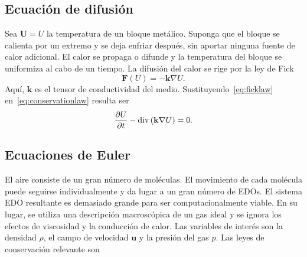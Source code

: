 \subsection*{Ecuación de difusión}

Sea $\mathbf{U}=U$ la temperatura de un bloque metálico.
Suponga que el bloque se calienta por un extremo y se deja enfriar
después, sin aportar ninguna fuente de calor adicional.
El calor se propaga o difunde y la temperatura del bloque se
uniformiza al cabo de un tiempo.
La difusión del calor se rige por la ley de Fick
\begin{equation}\label{eq:ficklaw}
	\mathbf{F}\left(U\right)=
	-\mathbf{k}\nabla U.
\end{equation}
Aquí, $\mathbf{k}$ es el tensor de conductividad del medio.
Sustituyendo~\eqref{eq:ficklaw} en~\eqref{eq:conservationlaw}
resulta ser
\begin{equation}
	\diffp{U}{t}-
	\operatorname{div}
	\left(\mathbf{k}\nabla U\right)=
	0.
\end{equation}

\subsection*{Ecuaciones de Euler}

El aire consiste de un gran número de moléculas.
El movimiento de cada molécula puede seguirse individualmente y
da lugar a un gran número de EDOs.
El sistema EDO resultante es demasiado grande para ser
computacionalmente viable.
En su lugar, se utiliza una descripción macroscópica de un gas ideal
y se ignora los efectos de viscosidad y la conducción de calor.
Las variables de interés son la densidad $\rho$, el campo de
velocidad $\mathbf{u}$ y la presión del gas $p$.
Las leyes de conservación relevante son

